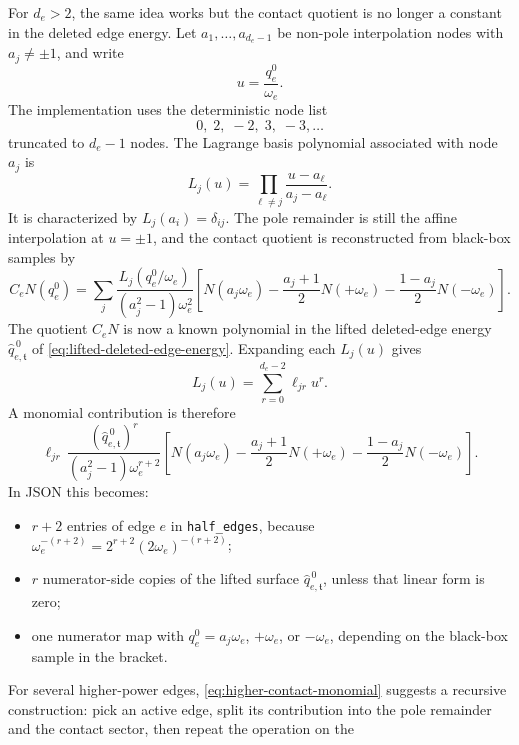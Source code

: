 \documentclass[11pt,a4paper]{report}
\begin{document}
For \(d_e>2\), the same idea works but the contact quotient is no longer a
constant in the deleted edge energy.  Let \(a_1,\ldots,a_{d_e-1}\) be
non-pole interpolation nodes with \(a_j\ne\pm1\), and write
\[
  u=\frac{q_e^0}{\omega_e}.
\]
The implementation uses the deterministic node list
\[
  0,\;2,\;-2,\;3,\;-3,\ldots
\]
truncated to \(d_e-1\) nodes.  The Lagrange basis polynomial associated with
node \(a_j\) is
\begin{equation}
  L_j(u)=
  \prod_{\ell\ne j}\frac{u-a_\ell}{a_j-a_\ell}.
  \label{eq:lagrange-basis}
\end{equation}
It is characterized by \(L_j(a_i)=\delta_{ij}\).  The pole remainder is still
the affine interpolation at \(u=\pm1\), and the contact quotient is
reconstructed from black-box samples by
\begin{equation}
  C_eN(q_e^0)
  =
  \sum_{j}
  \frac{L_j(q_e^0/\omega_e)}{(a_j^2-1)\omega_e^2}
  \left[
    N(a_j\omega_e)
    -\frac{a_j+1}{2}N(+\omega_e)
    -\frac{1-a_j}{2}N(-\omega_e)
  \right].
  \label{eq:higher-contact}
\end{equation}
The quotient \(C_eN\) is now a known polynomial in the lifted deleted-edge
energy \(\widehat q_{e,\mathfrak t}^{\,0}\) of
\eqref{eq:lifted-deleted-edge-energy}.  Expanding each \(L_j(u)\) gives
\[
  L_j(u)=\sum_{r=0}^{d_e-2}\ell_{jr}u^r .
\]
A monomial contribution is therefore
\begin{equation}
  \ell_{jr}\,
  \frac{(\widehat q_{e,\mathfrak t}^{\,0})^r}
       {(a_j^2-1)\omega_e^{r+2}}
  \left[
    N(a_j\omega_e)
    -\frac{a_j+1}{2}N(+\omega_e)
    -\frac{1-a_j}{2}N(-\omega_e)
  \right].
  \label{eq:higher-contact-monomial}
\end{equation}
In JSON this becomes:
\begin{itemize}[leftmargin=2em]
  \item \(r+2\) entries of edge \(e\) in \texttt{half\_edges}, because
        \(\omega_e^{-(r+2)}=2^{r+2}(2\omega_e)^{-(r+2)}\);
  \item \(r\) numerator-side copies of the lifted surface
        \(\widehat q_{e,\mathfrak t}^{\,0}\), unless that linear form is zero;
  \item one numerator map with \(q_e^0=a_j\omega_e\), \(+\omega_e\), or
        \(-\omega_e\), depending on the black-box sample in the bracket.
\end{itemize}
For several higher-power edges, \eqref{eq:higher-contact-monomial} suggests a
recursive construction: pick an active edge, split its contribution into the
pole remainder and the contact sector, then repeat the operation on the
\end{document}
